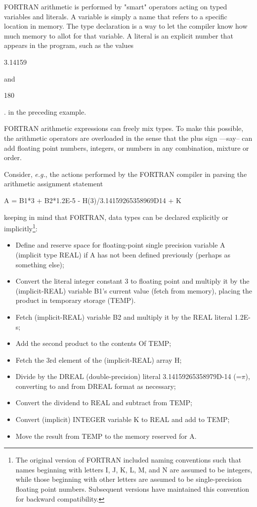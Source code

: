  
FORTRAN arithmetic is performed by "smart" operators acting on typed variables and literals. A variable is simply a name that refers to a specific location in memory. The type declaration is a way to let the compiler know how much memory to allot for that variable. A literal is an explicit number that appears in the program, such as the values \begin{code}3.14159\end{code} and \begin{code}180\end{code}. in the preceding example.

FORTRAN arithmetic expressions can freely mix types. To make this possible, the arithmetic operators are overloaded in the sense that the plus sign —say-- can add floating point numbers, integers, or numbers in any combination, mixture or order.

Consider, \textit{e.g.}, the actions performed by the FORTRAN compiler in parsing the arithmetic assignment statement 

\begin{code}
A = B1*3 + B2*1.2E-5 - H(3)/3.14159265358969D14 + K
\end{code}

keeping in mind that FORTRAN, data types can be declared explicitly or implicitly\footnote{The original version of FORTRAN included naming conventions such that names beginning with letters I, J, K, L, M, and N are assumed to be integers, while those beginning with other letters are assumed to be single-precision floating point numbers. Subsequent versions have maintained this convention for backward compatibility.}:
\begin{itemize}
    \item Define and reserve space for floating-point single precision variable A (implicit type REAL) if A has not been defined previously (perhaps as something else);
    \item Convert the literal integer constant 3 to floating point and multiply it by the (implicit-REAL) variable B1's current value (fetch from memory), placing the product in temporary storage (TEMP).
    \item Fetch (implicit-REAL) variable B2 and multiply it by the REAL literal 1.2E-s;
    \item Add the second product to the contents Of TEMP;
    \item Fetch the 3rd element of the (implicit-REAL) array H;
    \item Divide by the DREAL (double-precision) literal 3.14159265358979D-14 (=$\pi$), converting to and from DREAL format as necessary;
    \item Convert the dividend to REAL and subtract from TEMP;
    \item Convert (implicit) INTEGER variable K to REAL and add to TEMP;
    \item Move the result from TEMP to the memory reserved for A.
\end{itemize}

